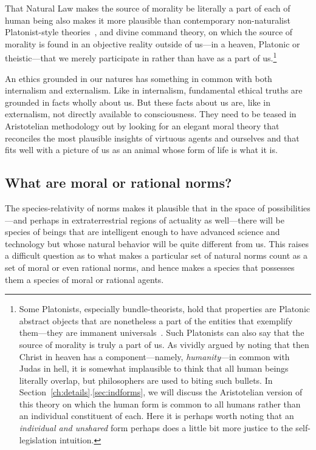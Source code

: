 That Natural Law makes the source of morality be literally a part of each of human being also makes it more
plausible than contemporary non-naturalist Platonist-style theories~, and divine command theory, on which the source 
of morality is found in  an objective reality outside of us---in a heaven, Platonic or theistic---that we 
merely participate in rather than have as a part of us.\footnote{Some Platonists, especially bundle-theorists, 
hold that properties are Platonic abstract objects that are nonetheless a part of the entities that exemplify
them---they are immanent universals~\parencite{ArmstrongWorld}. Such Platonists can also say that the source of morality is truly a part of us. As  vividly argued by noting that then Christ in heaven has a component---namely,
\textit{humanity}---in common with Judas in hell, it is somewhat implausible to think that all human beings literally overlap, 
but philosophers are used to biting such bullets. In Section~\ref{ch:details}.\ref{sec:indforms}, we will discuss the Aristotelian version of this theory
on which the human form is common to all humans rather than an individual constituent of each. Here it is perhaps
worth noting that an \textit{individual and unshared} form perhaps does a little bit more justice to the 
self-legislation intuition.}

An ethics grounded in our natures has something in common with both internalism and externalism. Like in internalism,
fundamental ethical truths are grounded in facts wholly about us. But these facts about us are, like in externalism,
not directly available to consciousness. They need to be teased in Aristotelian methodology out by looking for an
elegant moral theory that reconciles the most plausible insights of virtuous agents and ourselves and that fits 
well with a picture of us as an animal whose form of life is what it is.

\subsection{What are moral or rational norms?}\label{sec:moral-functionalism}
The species-relativity of norms makes it plausible that in the space of possibilities---and perhaps in 
extraterrestrial regions of actuality as well---there will be species of beings that are intelligent enough to have advanced science and technology but whose natural
behavior will be quite different from us. This raises a difficult question as to what makes a particular set of
natural norms count as a set of moral or even rational norms, and hence makes a species that possesses them a species of moral 
or rational agents.

